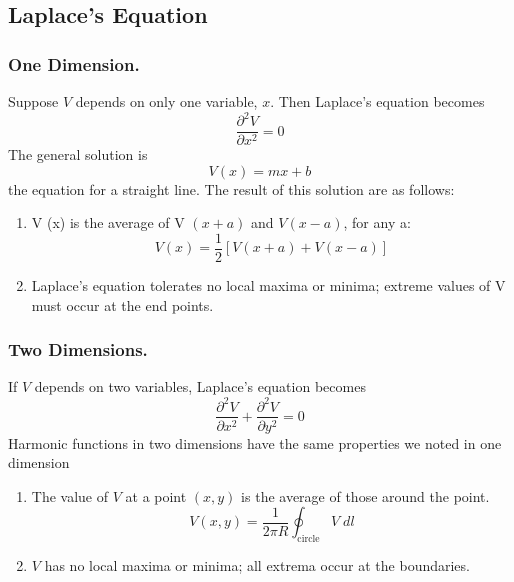 \documentclass[../../../main.tex]{subfiles}
\begin{document}
\subsection{Laplace's Equation}
\subsubsection{One Dimension.} Suppose $V$ depends on only one variable, $x$. Then Laplace's equation becomes
\begin{equation*}
   \frac{\partial^2V}{\partial x^2}=0
\end{equation*}
The general solution is
\begin{equation*}
    V(x)=mx+b
\end{equation*}
the equation for a straight line. The result of this solution are as follows:
\begin{enumerate}
    \item V (x) is the average of V $(x + a)$ and $V (x - a)$, for any a:
    \begin{equation*}
        V (x) = \frac{1}{2} [V (x + a) + V (x - a)]
    \end{equation*}
    \item Laplace's equation tolerates no local maxima or minima; extreme values
    of V must occur at the end points. 
\end{enumerate}

\subsubsection{Two Dimensions.} If $V$ depends on two variables, Laplace’s equation becomes
\begin{equation*}
    \frac{\partial^2V}{\partial x^2}+\frac{\partial^2V}{\partial y^2}=0
\end{equation*}
Harmonic functions in two dimensions have the same properties we noted in
one dimension
\begin{enumerate}
    \item The value of $V$ at a point $(x, y)$ is the average of those around the point.
    \begin{equation*}
        V(x,y)=\frac{1}{2\pi R}\oint_{\text{circle}}V\;dl
    \end{equation*}
    \item $V$ has no local maxima or minima; all extrema occur at the boundaries.
\end{enumerate} 
\end{document}
